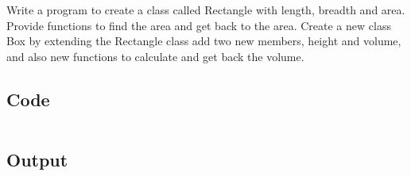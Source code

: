 \documentclass[../main.tex]{subfiles}
\begin{document}
Write a program to create a class called Rectangle with length, breadth and
area. Provide functions to find the area and get back to the area. Create a new
class Box by extending the Rectangle class add two new members, height and
volume, and also new functions to calculate and get back the volume.

\subsection{Code}
\inputminted[frame=lines, breaklines, breakanywhere, numberblanklines=false]{java}{./programs/prog6/Box.java}

\subsection{Output}
\end{document}
